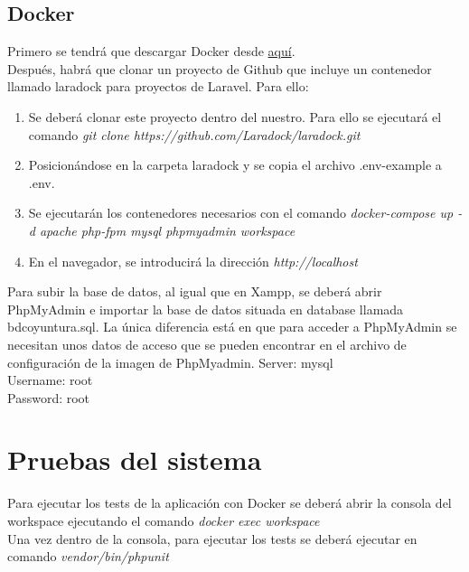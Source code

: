 \subsection{Docker}
Primero se tendrá que descargar Docker desde \href{https://www.docker.com/products/docker-desktop}{aquí}.\\
Después, habrá que clonar un proyecto de Github que incluye un contenedor llamado laradock para proyectos de Laravel. Para ello:
\begin{enumerate}
    \item Se deberá clonar este proyecto dentro del nuestro. Para ello se ejecutará el comando \textit{git clone https://github.com/Laradock/laradock.git}
    \item Posicionándose en la carpeta laradock y se copia el archivo .env-example a .env.
    \item Se ejecutarán los contenedores necesarios con el comando \textit{docker-compose up -d apache php-fpm mysql phpmyadmin workspace }
    \item En el navegador, se introducirá la dirección \textit{http://localhost}
\end{enumerate}
Para subir la base de datos, al igual que en Xampp, se deberá abrir PhpMyAdmin e importar la base de datos situada en database llamada bdcoyuntura.sql. La única diferencia está en que para acceder a PhpMyAdmin se necesitan unos datos de acceso que se pueden encontrar en el archivo de configuración de la imagen de PhpMyadmin.
Server: mysql\\
Username: root\\
Password: root\\
\section{Pruebas del sistema}
Para ejecutar los tests de la aplicación con Docker se deberá abrir la consola del workspace ejecutando el comando \textit{docker exec workspace}\\
Una vez dentro de la consola, para ejecutar los tests se deberá ejecutar en comando \textit{vendor/bin/phpunit}\\
